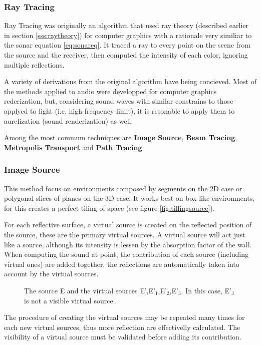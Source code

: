 \subsubsection{Ray Tracing}

Ray Tracing was originally an algorithm that used ray theory
(described earlier in section \ref{sss:raytheory}) for computer graphics with a
rationale very similiar to the sonar equation \ref{eq:sonareq}. It traced a ray to every point on the scene
from the source and the receiver, then computed the intensity of each color,
ignoring multiple reflections. 

A variety of derivations from the original algorithm have being concieved. Most
of the methods applied to audio were developped for computer graphics
rederization, but, considering sound waves with similar constrains to those
applyed to light (i.e. high frequency limit), it is resonable to apply them to
aurelization (sound renderization) as well.


Among the most commum techniques are \textbf{Image Source}, \textbf{Beam
Tracing}, \textbf{Metropolis Transport} and \textbf{Path Tracing}.

\subsubsection{Image Source}

This method focus on environments composed by segments on the 2D case or
polygonal slices of planes on the 3D case. It works best on box like
environments, for this creates a perfect tiling of
space\cite{funkhouser2003survey} (see figure \ref{fig:tillingsource}).

For each reflective surface, a virtual source is created on the reflected
position of the source, these are the primary virtual sources. A virtual source
will act just like a source, although its intensity is lessen by the absorption
factor of the wall. When computing the sound at point, the
contribution of each source (including virtual ones) are added together, the
reflections are automatically taken into account by the virtual sources.

\begin{figure}[h]
	\centering
	
	\caption{The source E and the virtual sources E',E'$_1$,E'$_2$,E'$_3$. In this
	case, E'$_3$ is not a visible virtual source.}
	\label{fig:imagesource}
\end{figure}


The procedure of creating the virtual sources may be repeated many times for
each new virtual sources, thus more reflection are effectivelly calculated. The
visibility of a virtual source must be validated before adding its contribution.

